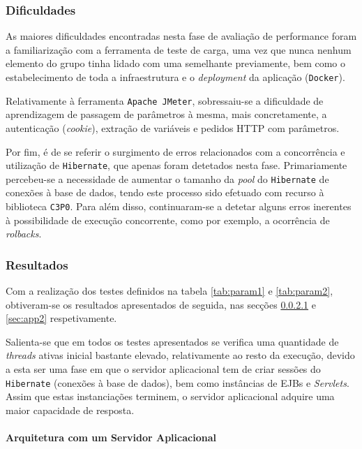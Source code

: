 \subsubsection{Dificuldades}

As maiores dificuldades encontradas nesta fase de avaliação de performance foram a familiarização com a ferramenta de teste de carga, uma vez que nunca nenhum elemento do grupo tinha lidado com uma semelhante previamente, bem como o estabelecimento de toda a infraestrutura e o \textit{deployment} da aplicação (\texttt{Docker}).

Relativamente à ferramenta \texttt{Apache JMeter}, sobressaiu-se a dificuldade de aprendizagem de passagem de parâmetros à mesma, mais concretamente, a autenticação (\textit{cookie}), extração de variáveis e pedidos HTTP com parâmetros. 

Por fim, é de se referir o surgimento de erros relacionados com a concorrência e utilização de \texttt{Hibernate}, que apenas foram detetados nesta fase. Primariamente percebeu-se a necessidade de aumentar o tamanho da \textit{pool} do \texttt{Hibernate} de conexões à base de dados, tendo este processo sido efetuado com recurso à biblioteca \texttt{C3P0}. Para além disso, continuaram-se a detetar alguns erros inerentes à possibilidade de execução concorrente, como por exemplo, a ocorrência de \textit{rolbacks}.

\subsubsection{Resultados}

Com a realização dos testes definidos na tabela \ref{tab:param1} e \ref{tab:param2}, obtiveram-se os resultados apresentados de seguida, nas secções \ref{sec:app1} e \ref{sec:app2} respetivamente. 

Salienta-se que em todos os testes apresentados se verifica uma quantidade de \textit{threads} ativas inicial bastante elevado, relativamente ao resto da execução, devido a esta ser uma fase em que o servidor aplicacional tem de criar sessões do \texttt{Hibernate} (conexões à base de dados), bem como instâncias de EJBs e \textit{Servlets}. Assim que estas instanciações terminem, o servidor aplicacional adquire uma maior capacidade de resposta.

\newpage
\paragraph{Arquitetura com um Servidor Aplicacional}\label{sec:app1}

